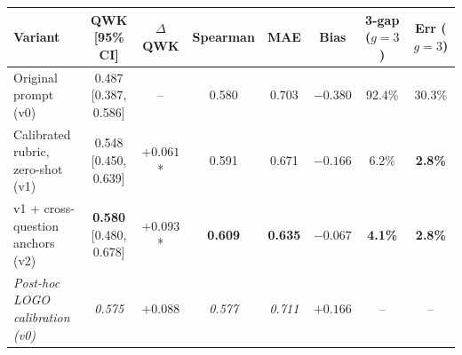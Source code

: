 \begin{tabular}{lccccccc}
\toprule
Variant & QWK [95\% CI] & $\Delta$QWK & Spearman & MAE & Bias & 3-gap ($g{=}3$) & Err ($g{=}3$) \\
\midrule
Original prompt (v0) & 0.487 [0.387, 0.586] & -- & 0.580 & 0.703 & $-0.380$ & 92.4\% & 30.3\% \\
Calibrated rubric, zero-shot (v1) & 0.548 [0.450, 0.639] & $+0.061$* & 0.591 & 0.671 & $-0.166$ & 6.2\% & \textbf{2.8\%} \\
v1 + cross-question anchors (v2) & \textbf{0.580} [0.480, 0.678] & $+0.093$* & \textbf{0.609} & \textbf{0.635} & \textbf{$-0.067$} & \textbf{4.1\%} & \textbf{2.8\%} \\
\midrule
\emph{Post-hoc LOGO calibration (v0)} & \emph{0.575} & \emph{$+0.088$} & \emph{0.577} & \emph{0.711} & \emph{$+0.166$} & -- & -- \\
\bottomrule
\end{tabular}

